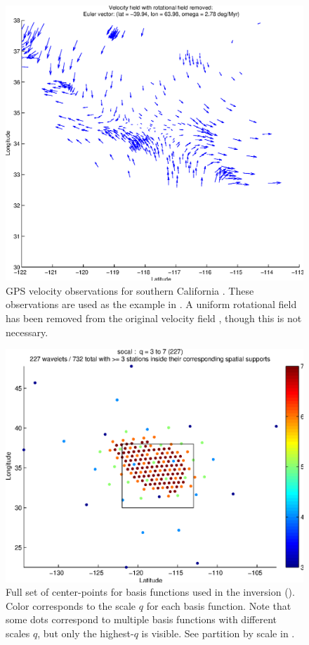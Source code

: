 \documentclass[11pt,titlepage,fleqn]{article}
\begin{document}

\begin{figure}
\includegraphics[width=16cm]{fig2D_A5.eps}
\caption[]
{{
GPS velocity observations for southern California \citep{REASONI}.
These observations are used as the example in .
A uniform rotational field has been removed from the original velocity field \citep[\eg][]{Tape2009gps}, though this is not necessary.
\label{fig:2D_A5}
}}
\end{figure}

\begin{figure}
\includegraphics[width=16cm]{fig2D_A6.eps}
\caption[]
{{
Full set of center-points for basis functions used in the inversion ().
Color corresponds to the scale $q$ for each basis function.
Note that some dots correspond to multiple basis functions with different scales $q$, but only the highest-$q$ is visible.
See partition by scale in .
\label{fig:2D_A6}
}}
\end{figure}
\end{document}
